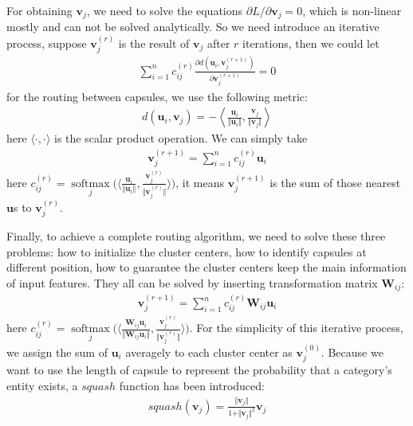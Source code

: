 \documentclass[times,twocolumn,final]{elsarticle}
\begin{document}
For obtaining $\mathbf{v}_j$, we need to solve the equations $\partial L/\partial \mathbf{v}_j=0$, which is non-linear mostly and can not be solved analytically. So we need introduce an iterative process, suppose $\mathbf{v}_j^{(r)}$ is the result of $\mathbf{v}_j$ after $r$ iterations, then we could let
    \begin{align}
      \sum_{i=1}^n c_{ij}^{(r)}\frac{\partial d\left(\mathbf{u}_i, \mathbf{v}_j^{(r+1)}\right)}{\partial \mathbf{v}_j^{(r+1)}}=0
    \end{align}
for the routing between capsules, we use the following metric:
    \begin{align}
      d(\mathbf{u}_i, \mathbf{v}_j)=-\left\langle\frac{\mathbf{u}_i}{\Vert\mathbf{u}_i\Vert}, \frac{\mathbf{v}_j}{\Vert\mathbf{v}_j\Vert}\right\rangle
    \end{align}
here $\langle \cdot, \cdot \rangle$ is the scalar product operation. We can simply take
    \begin{align}
      \mathbf{v}_j^{(r+1)}=\sum\limits_{i=1}^n c_{ij}^{(r)}\mathbf{u}_i   
    \end{align}
here $c_{ij}^{(r)} = \mathop{softmax}\limits_j \Big(\langle\frac{\mathbf{u}_i}{\Vert\mathbf{u}_i\Vert}, \frac{\mathbf{v}_j^{(r)}}{\Vert\mathbf{v}_j^{(r)}\Vert}\rangle\Big)$, it means $\mathbf{v}_j^{(r+1)}$ is the sum of those nearest $\mathbf{u}$s to $\mathbf{v}_j^{(r)}$. 

Finally, to achieve a complete routing algorithm, we need to solve these three problems: how to initialize the cluster centers, how to identify capsules at different position, how to guarantee the cluster centers keep the main information of input features. They all can be solved by inserting transformation matrix $\mathbf{W}_{ij}$:
    \begin{align}
      \mathbf{v}_j^{(r+1)}= \sum\limits_{i=1}^n c_{ij}^{(r)}\mathbf{W}_{ij}\mathbf{u}_i
    \end{align}
here $c_{ij}^{(r)}=\mathop{softmax}\limits_j \Big(\langle\frac{\mathbf{W}_{ij}\mathbf{u}_i}{\Vert\mathbf{W}_{ij}\mathbf{u}_i\Vert}, \frac{\mathbf{v}_j^{(r)}}{\Vert\mathbf{v}_j^{(r)}\Vert}\rangle\Big)$. For the simplicity of this iterative process, we assign the sum of $\mathbf{u}_i$ averagely to each cluster center as $\mathbf{v}_j^{(0)}$. Because we want to use the length of capsule to represent the probability that a category's entity exists, a $squash$ function has been introduced:
    \begin{align}
      squash(\mathbf{v}_j)= \frac{\Vert \mathbf{v}_j \Vert}{1 + \Vert \mathbf{v}_j \Vert^2} \mathbf{v}_j
    \end{align}
    
\end{document}

